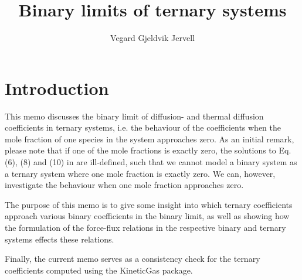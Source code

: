 \documentclass{article}
\title{Binary limits of ternary systems}
\author{Vegard Gjeldvik Jervell}
\begin{document}
\maketitle
\tableofcontents

\section{Introduction}

This memo discusses the binary limit of diffusion- and thermal diffusion coefficients in ternary systems, i.e. the behaviour of the coefficients when the mole fraction of one species in the system approaches zero. As an initial remark, please note that if one of the mole fractions is exactly zero, the solutions to Eq. (6), (8) and (10) in \cite{retmie} are ill-defined, such that we cannot model a binary system as a ternary system where one mole fraction is exactly zero. We can, however, investigate the behaviour when one mole fraction approaches zero.

The purpose of this memo is to give some insight into which ternary coefficients approach various binary coefficients in the binary limit, as well as showing how the formulation of the force-flux relations in the respective binary and ternary systems effects these relations.

Finally, the current memo serves as a consistency check for the ternary coefficients computed using the KineticGas package.


\clearpage


\clearpage



\end{document}
